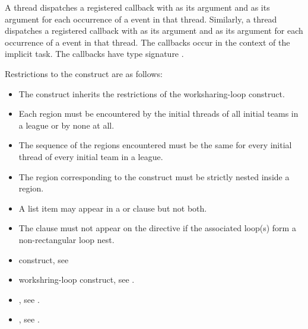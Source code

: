 \tools

A thread dispatches a registered  callback with 
 as its  argument and 
 as its  argument for each occurrence 
of a  event in that thread. Similarly, a thread dispatches 
a registered  callback with  as 
its  argument and  as its  
argument for each occurrence of a  event in that thread.
The callbacks occur in the context of the implicit task. The callbacks have 
type signature .

\restrictions
Restrictions to the  construct are as follows:

\begin{itemize}
\item The  construct inherits the restrictions of the worksharing-loop construct.

\item Each  region must be encountered by the initial
threads of all initial teams in a league or by none at all.

\item The sequence of the  regions encountered must
be the same for every initial thread of every initial team in a league.

\item The region corresponding to the  construct must be
strictly nested inside a  region.

\item A list item may appear in a  or  clause but not both.

\item The  clause must not appear on the 
    directive if the associated loop(s) form a non-rectangular loop nest.
\end{itemize}

\crossreferences
\begin{itemize}
\item {} construct, see

\item workshring-loop construct, see
.

\item {}, see .
\item {}, see
.
\end{itemize}





